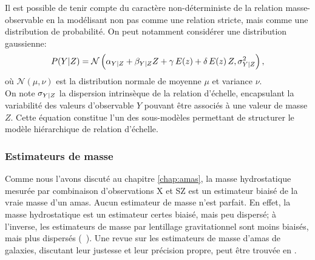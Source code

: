 Il est possible de tenir compte du caractère non-déterministe de la relation masse-observable en la modélisant non pas comme une relation stricte, mais comme une distribution de probabilité.
On peut notamment considérer une distribution gaussienne:
\begin{equation}
    \label{eq:scaling:general_pdf}
    P({Y|Z}) = \mathcal{N} \left(\alpha_{Y|Z} + \beta_{Y|Z} Z + \gamma \, E(z) + \delta \, E(z) \, Z, \sigma_{Y|Z}^2 \right),
\end{equation}
où $\mathcal{N}(\mu, \nu)$ est la distribution normale de moyenne $\mu$ et variance $\nu$. \\
On note $\sigma_{Y|Z}$ la dispersion intrinsèque de la relation d'échelle, encapsulant la variabilité des valeurs d'observable $Y$ pouvant être associés à une valeur de masse $Z$.
Cette équation constitue l'un des sous-modèles permettant de structurer le modèle hiérarchique de relation d'échelle.

\subsubsection{Estimateurs de masse} %
\label{sec:eddington_biases}

Comme nous l'avons discuté au chapitre \ref{chap:amas}, la masse hydrostatique mesurée par combinaison d'observations X et SZ est un estimateur biaisé de la vraie masse d'un amas.
Aucun estimateur de masse n'est parfait.
En effet, la masse hydrostatique est un estimateur certes biaisé, mais peu dispersé; à l'inverse, les estimateurs de masse par lentillage gravitationnel sont moins biaisés, mais plus dispersés (\eg\ \cite{grandis_calibration_2021,sommer_weak_2021}).
Une revue sur les estimateurs de masse d'amas de galaxies, discutant leur justesse et leur précision propre, peut être trouvée en \cite{pratt_galaxy_2019}.

